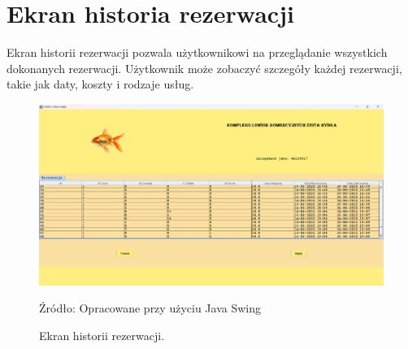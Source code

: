 \section{Ekran historia rezerwacji}
Ekran historii rezerwacji pozwala użytkownikowi na przeglądanie wszystkich dokonanych rezerwacji. Użytkownik może zobaczyć szczegóły każdej rezerwacji, takie jak daty, koszty i rodzaje usług.
\begin{figure}[H]
    \centering
    \includegraphics[width=0.8\linewidth]{figures/history.eps}
    \caption{Ekran historii rezerwacji.}
    \label{fig:history_screen}
    \small{Źródło: Opracowane przy użyciu Java Swing}
\end{figure}



